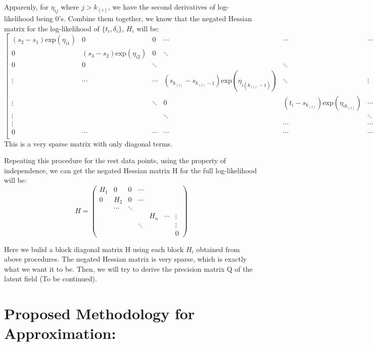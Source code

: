 \documentclass[]{article}
\begin{document}
Apparenly, for \(\eta_{ij}\) where \(j>k_{(i)}\), we have the second
derivatives of log-likelihood being 0's. Combine them together, we know
that the negated Hessian matrix for the log-likelihood of
\(\{t_i,\delta_i\}\), \(H_i\) will be: \begin{equation}
\begin{bmatrix}
(s_2-s_1)\text{exp}(\eta_{i1})  & 0  & 0 & \cdots & \cdots & \cdots & 0 \\
0  & (s_3-s_2)\text{exp}(\eta_{i2})  & 0  & \ddots & && &  \\
0 & 0  & \ddots &   & \ddots & &  &  \\
\vdots & \cdots & \cdots & (s_{k_{(i)}}-s_{k_{(i)}-1})\text{exp}(\eta_{i(k_{(i)}-1)}) & \ddots & \vdots &  &  \\
\vdots & & \ddots & 0 & (t_i-s_{k_{(i)}})\text{exp}(\eta_{ik_{(i)}}) & \cdots & \vdots& \\
\vdots  & & & \ddots &   & \ddots  &  \vdots\\
\vdots  & && & \cdots & \cdots & \vdots\\
0 & \cdots &  \cdots & \cdots & \cdots & \cdots & 0\\
\end{bmatrix}
\end{equation} This is a very sparse matrix with only diagonal terms.

Repeating this procedure for the rest data points, using the property of
independence, we can get the negated Hessian matrix H for the full
log-likelihood will be: \begin{equation}
H = \begin{pmatrix} 
H_1 & 0 & 0 & \cdots & & \\ 
0 & H_2 & 0 & \cdots & & \\
  & \cdots & \ddots &  & & \\
& & & & H_n & \cdots & \vdots \\ 
& & & \ddots & &&\vdots \\
& & & & & & 0
\end{pmatrix}
\end{equation}

Here we bulid a block diagonal matrix H using each block \(H_i\)
obtained from above procedures. The negated Hessian matrix is very
sparse, which is exactly what we want it to be. Then, we will try to
derive the precision matrix Q of the latent field (To be continued).

\hypertarget{proposed-methodology-for-approximation}{%
\section{Proposed Methodology for
Approximation:}\label{proposed-methodology-for-approximation}}
\end{document}
